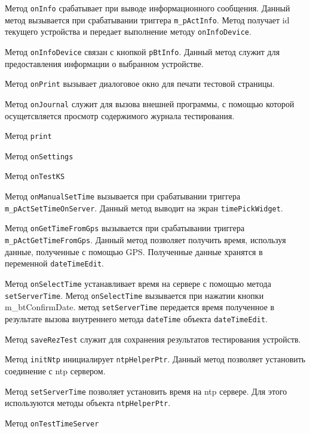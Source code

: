 \begin{enum}
	\item Метод \texttt{onInfo} срабатывает при выводе информационного сообщения. Данный метод вызывается при
		срабатывании триггера \texttt{m\_pActInfo}. Метод получает id текущего устройства и передает выполнение
		методу \texttt{onInfoDevice}.

	\item Метод \texttt{onInfoDevice} связан с кнопкой \texttt{pBtInfo}. Данный метод служит для предоставления
		информации о выбранном устройстве.

	\item Метод \texttt{onPrint} вызывает диалоговое окно для печати тестовой страницы.
	\item Метод \texttt{onJournal} служит для вызова внешней программы, с помощью которой осущетсвляется просмотр
		содержимого журнала тестирования.

	\item Метод \texttt{print}
	\item Метод \texttt{onSettings}
	\item Метод \texttt{onTestKS}
	\item Метод \texttt{onManualSetTime} вызывается при срабатывании триггера \texttt{m\_pActSetTimeOnServer}.
		Данный метод выводит на экран \texttt{timePickWidget}.

	\item Метод \texttt{onGetTimeFromGps} вызывается при срабатывании триггера \texttt{m\_pActGetTimeFromGps}.
		Данный метод позволяет получить время, используя данные, полученные с помощью GPS. Полученные данные
		хранятся в переменной \texttt{dateTimeEdit}.

	\item Метод \texttt{onSelectTime} устанавливает время на сервере с помощью метода \texttt{setServerTime}. Метод
		\texttt{onSelectTime} вызывается при нажатии кнопки {m\_btConfirmDate}.
		метод \texttt{setServerTime} передается время полученное в результате вызова внутреннего метода
		\texttt{dateTime} объекта \texttt{dateTimeEdit}.

	\item Метод \texttt{saveRezTest} служит для сохранения результатов тестирования устройств.
	\item Метод \texttt{initNtp} инициалирует \texttt{ntpHelperPtr}. Данный метод позволяет установить соединение с
		ntp сервером.

	\item Метод \texttt{setServerTime} позволяет установить время на ntp сервере. Для этого используются методы
		объекта \texttt{ntpHelperPtr}.

	\item Метод \texttt{onTestTimeServer}
\end{enum}
